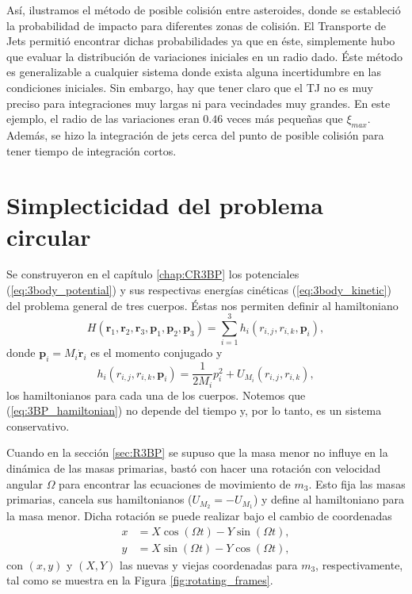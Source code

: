 Así, ilustramos el método de posible colisión entre asteroides, donde se estableció la probabilidad de impacto para diferentes zonas de colisión. El Transporte de Jets permitió encontrar dichas probabilidades ya que en éste, simplemente hubo que evaluar la distribución de variaciones iniciales en un radio dado. Éste método es generalizable a cualquier sistema donde exista alguna incertidumbre en las condiciones iniciales. Sin embargo, hay que tener claro que el TJ no es muy preciso para integraciones muy largas ni para vecindades muy grandes. En este ejemplo, el radio de las variaciones eran $0.46$ veces más pequeñas que $\xi_{max}$. Además, se hizo la integración de jets cerca del punto de posible colisión para tener tiempo de integración cortos. 


\section{Simplecticidad del problema circular}
\label{sec:C3BP_simplecticity}

Se construyeron en el capítulo \ref{chap:CR3BP} los potenciales (\ref{eq:3body_potential}) y sus respectivas energías cinéticas (\ref{eq:3body_kinetic}) del problema general de tres cuerpos. Éstas nos permiten definir al hamiltoniano
\begin{equation}
 H(\mathbf{r}_1, \mathbf{r}_2, \mathbf{r}_3, \mathbf{p}_1, \mathbf{p}_2, \mathbf{p}_3) = \sum_{i=1}^3 h_i(r_{i,j}, r_{i,k}, \mathbf{p}_i),
 \label{eq:3BP_hamiltonian}
\end{equation} 
donde $\mathbf{p}_i = M_i \dot{\mathbf{r}}_i$ es el momento conjugado y
\begin{equation}
 h_i(r_{i,j}, r_{i,k}, \mathbf{p}_i) = \frac{1}{2 M_i} p_i^2 + U_{M_i}(r_{i,j}, r_{i,k}),
 \label{eq:individual_hamiltonian}
\end{equation}
los hamiltonianos para cada una de los cuerpos. Notemos que (\ref{eq:3BP_hamiltonian}) no depende del tiempo y, por lo tanto, es un sistema conservativo. 

Cuando en la sección \ref{sec:R3BP} se supuso que la masa menor no influye en la dinámica de las masas primarias, bastó con hacer una rotación con velocidad angular $\Omega$ para encontrar las ecuaciones de movimiento de $m_3$. Esto fija las masas primarias, cancela sus hamiltonianos ($  U_{M_2} = - U_{M_1}$) y define al hamiltoniano para la masa menor. Dicha rotación se puede realizar bajo el cambio de coordenadas
\begin{align*}
 x &= X\cos (\Omega t) - Y \sin (\Omega t), \\
 y &= X\sin (\Omega t) - Y \cos (\Omega t), 
\end{align*} 
con $(x,y)$ y $(X,Y)$ las nuevas y viejas coordenadas para $m_3$, respectivamente, tal como se muestra en la Figura \ref{fig:rotating_frames}.

